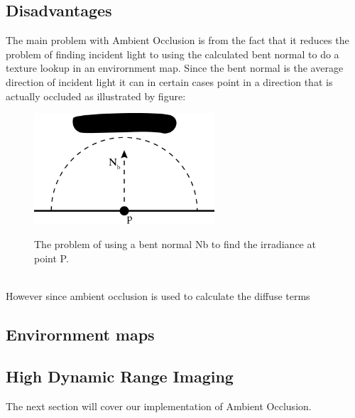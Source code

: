 \subsection{Disadvantages}
The main problem with Ambient Occlusion is from the fact that it reduces the problem of finding incident light to using the calculated bent normal to do a texture lookup in an envirornment map. Since the bent normal is the average direction of incident light it can in certain cases point in a direction that is actually occluded as illustrated by figure:
\\
\begin{figure}[h]
	\centering
	\includegraphics[width=0.6\textwidth]{Theory/bentNormalProblems}
	\label{fig:bent_normal}
	\caption{The problem of using a bent normal Nb to find the irradiance at point P.}
\end{figure}
\\
However since ambient occlusion is used to calculate the diffuse terms

\subsection{Envirornment maps}

\subsection{High Dynamic Range Imaging}

The next section will cover our implementation of Ambient Occlusion.
